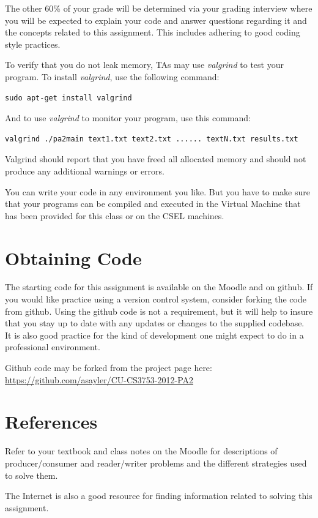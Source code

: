 \documentclass[12pt]{article}
\begin{document}
The other 60\% of your grade will be determined via your grading
interview where you will be expected to explain your code and answer
questions regarding it and the concepts related to this assignment.
This includes adhering to good coding style practices.

To verify that you do not leak memory, TAs may use
\textit{valgrind} to test your program. To install \textit{valgrind},
use the following command:

\begin{verbatim}
sudo apt-get install valgrind
\end{verbatim}

And to use \textit{valgrind} to monitor your program, use this
command:
\begin{verbatim}
valgrind ./pa2main text1.txt text2.txt ...... textN.txt results.txt
\end{verbatim}

Valgrind should report that you have freed all allocated memory and
should not produce any additional warnings or errors.

You can write your code in any environment you like. But you have to
make sure that your programs can be compiled and executed in the
Virtual Machine that has been provided for this class or on the CSEL
machines.

\section{Obtaining Code}
The starting code for this assignment is available on the Moodle and
on github. If you would like practice using a version control system,
consider forking the code from github. Using the github code is not
a requirement, but it will help to insure that you stay up to date
with any updates or changes to the supplied codebase. It is also
good practice for the kind of development one might expect to do in
a professional environment.

Github code may be forked from the project page here:
\url{https://github.com/asayler/CU-CS3753-2012-PA2}

\section{References}
Refer to your textbook and class notes on the Moodle for descriptions
of producer/consumer and reader/writer problems and the different
strategies used to solve them.

The Internet is also a good resource for finding information related
to solving this assignment.
\end{document}
